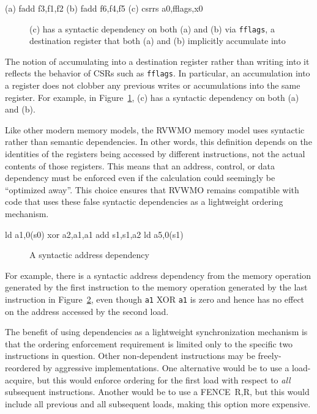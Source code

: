\begin{verbbox}
(a) fadd  f3,f1,f2
(b) fadd  f6,f4,f5
(c) csrrs a0,fflags,x0
\end{verbbox}
\begin{figure}[h!]
  \centering\small
  \theverbbox
  \caption{(c) has a syntactic dependency on both (a) and (b) via {\tt fflags}, a destination register that both (a) and (b) implicitly accumulate into}
  \label{fig:litmus:fflags}
\end{figure}

The notion of accumulating into a destination register rather than writing into it reflects the behavior of CSRs such as {\tt fflags}.
In particular, an accumulation into a register does not clobber any previous writes or accumulations into the same register.
For example, in Figure~\ref{fig:litmus:fflags}, (c) has a syntactic dependency on both (a) and (b).

Like other modern memory models, the RVWMO memory model uses syntactic rather than semantic dependencies.
In other words, this definition depends on the identities of the
registers being accessed by different instructions, not the actual
contents of those registers.  This means that an address, control, or
data dependency must be enforced even if the calculation could seemingly
be ``optimized away''.
This choice ensures that RVWMO remains compatible with code that uses these false syntactic dependencies as a lightweight ordering mechanism.

\begin{verbbox}
ld  a1,0(s0)
xor a2,a1,a1
add s1,s1,a2
ld  a5,0(s1)
\end{verbbox}
\begin{figure}[h!]
  \centering\small
  \theverbbox
  \caption{A syntactic address dependency}
  \label{fig:litmus:address}
\end{figure}

For example, there is a syntactic address
dependency from the memory operation generated by the first instruction to the memory operation generated by the last instruction in
Figure~\ref{fig:litmus:address}, even though {\tt a1} XOR {\tt a1} is zero and
hence has no effect on the address accessed by the second load.

The benefit of using dependencies as a lightweight synchronization mechanism is that the ordering enforcement requirement is limited only to the specific two instructions in question.
Other non-dependent instructions may be freely-reordered by aggressive implementations.
One alternative would be to use a load-acquire, but this would enforce ordering for the first load with respect to {\em all} subsequent instructions.
Another would be to use a FENCE~R,R, but this would include all previous and all subsequent loads, making this option more expensive.

